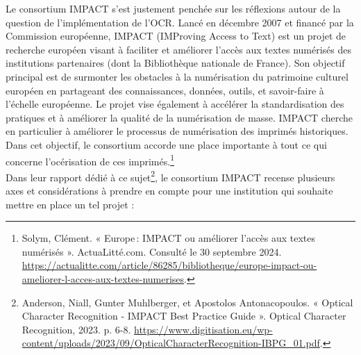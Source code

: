 \documentclass[a4paper,12pt,twoside]{book}
\begin{document}
Le consortium IMPACT s'est justement
penchée sur les réflexions autour de la question de l'implémentation de l'OCR. Lancé en décembre 2007 et financé par la Commission européenne, IMPACT (IMProving Access to Text) est un projet de recherche européen visant à faciliter et améliorer l'accès aux textes numérisés des institutions partenaires (dont la Bibliothèque nationale de France). Son objectif principal est de surmonter les obstacles à la numérisation du patrimoine culturel européen en partageant des connaissances, données, outils, et savoir-faire à l'échelle européenne. Le projet vise également à accélérer la standardisation des pratiques et à améliorer la qualité de la numérisation de masse. IMPACT cherche en particulier à améliorer le
processus de numérisation des imprimés historiques. Dans cet objectif, le consortium accorde une place importante à tout ce qui concerne l'océrisation de ces imprimés.\footnote{Solym, Clément. « Europe : IMPACT ou améliorer l’accès aux textes numérisés ». ActuaLitté.com. Consulté le 30 septembre 2024. 
	\url{https://actualitte.com/article/86285/bibliotheque/europe-impact-ou-ameliorer-l-acces-aux-textes-numerises}.} \\


Dans leur rapport dédié à ce
sujet\footnote{Anderson, Niall, Gunter Muhlberger, et Apostolos
	Antonacopoulos. « Optical Character Recognition - IMPACT Best Practice
	Guide ». Optical Character Recognition, 2023. p. 6-8.
	\url{https://www.digitisation.eu/wp-content/uploads/2023/09/OpticalCharacterRecognition-IBPG_01.pdf}.},
le consortium IMPACT recense plusieurs axes et considérations à prendre en compte pour
une institution qui souhaite mettre en place un tel projet : \\
\end{document}
